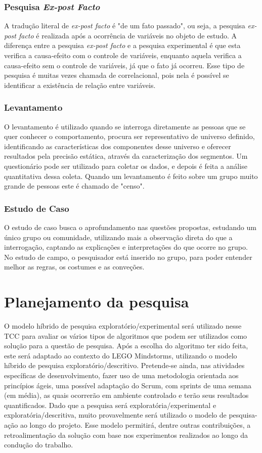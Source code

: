 \subsubsection{Pesquisa \textit{Ex-post Facto}}
A tradução literal de \textit{ex-post facto} é "de um fato passado", ou seja, a pesquisa \textit{ex-post facto} é realizada após a ocorrência de variáveis no objeto de estudo. A diferença entre a pesquisa \textit{ex-post facto} e a pesquisa experimental é que esta verifica a causa-efeito com o controle de variáveis, enquanto aquela verifica a causa-efeito sem o controle de variáveis, já que o fato já ocorreu. Esse tipo de pesquisa é muitas vezes chamada de correlacional, pois nela é possível se identificar a existência de relação entre variáveis. \cite{ac2002elaborar}
\subsubsection{Levantamento}
O levantamento é utilizado quando se interroga diretamente as pessoas que se quer conhecer o comportamento, procura ser representativo de universo definido, identificando as características dos componentes desse universo e oferecer resultados pela precisão estática, através da caracterização dos segmentos. Um questionário pode ser utilizado para coletar os dados, e depois é feita a análise quantitativa dessa coleta. Quando um levantamento é feito sobre um grupo muito grande de pessoas este é chamado de "censo". \cite{prodanov2013metodologia} 	
\subsubsection{Estudo de Caso}
O estudo de caso busca o aprofundamento nas questões propostas, estudando um único grupo ou comunidade, utilizando mais a observação direta do que a interrogação, captando as explicações e interpretações do que ocorre no grupo. No estudo de campo, o pesquisador está inserido no grupo, para poder entender melhor as regras, os costumes e as conveções.

\section{Planejamento da pesquisa}
O modelo híbrido de pesquisa exploratório/experimental será utilizado nesse TCC para avaliar os vários tipos de algoritmos que podem ser utilizados como solução para a questão de pesquisa. Após a escolha do algoritmo ter sido feita, este será adaptado ao contexto do LEGO Mindstorms, utilizando o modelo híbrido de pesquisa exploratório/descritivo.
Pretende-se ainda, nas atividades específicas de desenvolvimento, fazer uso de uma  metodologia orientada aos princípios ágeis, uma possível adaptação do Scrum, com sprints
de uma semana (em média), as quais ocorrerão em ambiente controlado e terão seus resultados quantificados.
Dado que a pesquisa será exploratória/experimental e exploratória/descritiva, muito provavelmente será utilizado o modelo de pesquisa-ação ao longo do projeto. Esse modelo permitirá, dentre outras contribuições, a retroalimentação da solução com base nos experimentos realizados ao longo da condução do trabalho.


